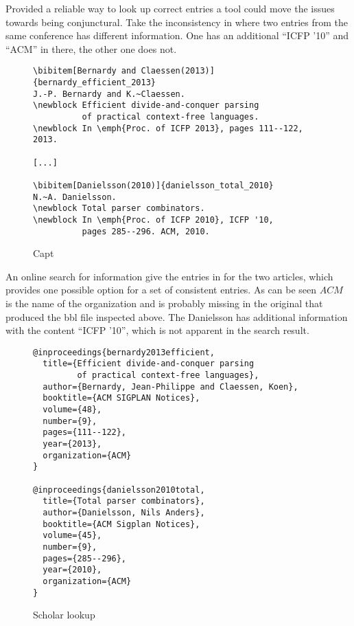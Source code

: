 
Provided a reliable way to look up correct entries a tool could move
the issues towards being conjunctural.  Take the inconsistency in
 where two entries from the same
conference has different information.  One has an additional ``ICFP
'10'' and ``ACM'' in there, the other one does not.

\begin{figure}
  \centering
  \begin{small}
\begin{verbatim}
\bibitem[Bernardy and Claessen(2013)]{bernardy_efficient_2013}
J.-P. Bernardy and K.~Claessen.
\newblock Efficient divide-and-conquer parsing 
          of practical context-free languages.
\newblock In \emph{Proc. of ICFP 2013}, pages 111--122, 2013.

[...]

\bibitem[Danielsson(2010)]{danielsson_total_2010}
N.~A. Danielsson.
\newblock Total parser combinators.
\newblock In \emph{Proc. of ICFP 2010}, ICFP '10,
          pages 285--296. ACM, 2010.
\end{verbatim}
  \end{small}
  \caption{Capt}
\label{fig:inconsistent_proceedings}
\end{figure}

An online search for {\bibtex} information give the entries in
 for the two articles, which
provides one possible option for a set of consistent entries.  As can
be seen $ACM$ is the name of the organization and is probably missing
in the original {\bibtex} that produced the bbl file inspected above.
The Danielsson has additional information with the content ``ICFP
'10'', which is not apparent in the search result.

\begin{figure}
  \centering
\begin{verbatim}
@inproceedings{bernardy2013efficient,
  title={Efficient divide-and-conquer parsing
         of practical context-free languages},
  author={Bernardy, Jean-Philippe and Claessen, Koen},
  booktitle={ACM SIGPLAN Notices},
  volume={48},
  number={9},
  pages={111--122},
  year={2013},
  organization={ACM}
}

@inproceedings{danielsson2010total,
  title={Total parser combinators},
  author={Danielsson, Nils Anders},
  booktitle={ACM Sigplan Notices},
  volume={45},
  number={9},
  pages={285--296},
  year={2010},
  organization={ACM}
}
\end{verbatim}
  \caption{Scholar lookup}
\label{fig:missing_org_scholar_lookup}
\end{figure}

